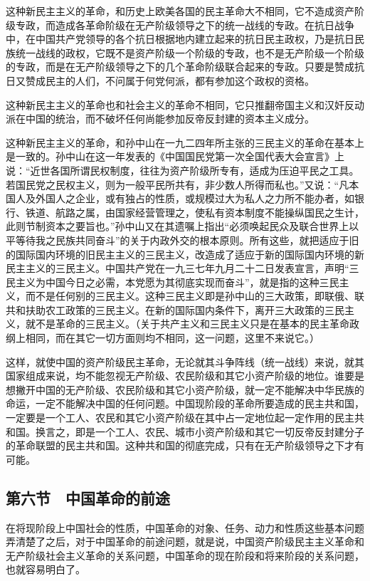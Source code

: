 这种新民主主义的革命，和历史上欧美各国的民主革命大不相同，它不造成资产阶级专政，而造成各革命阶级在无产阶级领导之下的统一战线的专政。在抗日战争中，在中国共产党领导的各个抗日根据地内建立起来的抗日民主政权，乃是抗日民族统一战线的政权，它既不是资产阶级一个阶级的专政，也不是无产阶级一个阶级的专政，而是在无产阶级领导之下的几个革命阶级联合起来的专政。只要是赞成抗日又赞成民主的人们，不问属于何党何派，都有参加这个政权的资格。

这种新民主主义的革命也和社会主义的革命不相同，它只推翻帝国主义和汉奸反动派在中国的统治，而不破坏任何尚能参加反帝反封建的资本主义成分。

这种新民主主义的革命，和孙中山在一九二四年所主张的三民主义的革命在基本上是一致的。孙中山在这一年发表的《中国国民党第一次全国代表大会宣言》上说：“近世各国所谓民权制度，往往为资产阶级所专有，适成为压迫平民之工具。若国民党之民权主义，则为一般平民所共有，非少数人所得而私也。”又说：“凡本国人及外国人之企业，或有独占的性质，或规模过大为私人之力所不能办者，如银行、铁道、航路之属，由国家经营管理之，使私有资本制度不能操纵国民之生计，此则节制资本之要旨也。”孙中山又在其遗嘱上指出“必须唤起民众及联合世界上以平等待我之民族共同奋斗”的关于内政外交的根本原则。所有这些，就把适应于旧的国际国内环境的旧民主主义的三民主义，改造成了适应于新的国际国内环境的新民主主义的三民主义。中国共产党在一九三七年九月二十二日发表宣言，声明“三民主义为中国今日之必需，本党愿为其彻底实现而奋斗”，就是指的这种三民主义，而不是任何别的三民主义。这种三民主义即是孙中山的三大政策，即联俄、联共和扶助农工政策的三民主义。在新的国际国内条件下，离开三大政策的三民主义，就不是革命的三民主义。（关于共产主义和三民主义只是在基本的民主革命政纲上相同，而在其它一切方面则均不相同，这一问题，这里不来说它。）

这样，就使中国的资产阶级民主革命，无论就其斗争阵线（统一战线）来说，就其国家组成来说，均不能忽视无产阶级、农民阶级和其它小资产阶级的地位。谁要是想撇开中国的无产阶级、农民阶级和其它小资产阶级，就一定不能解决中华民族的命运，一定不能解决中国的任何问题。中国现阶段的革命所要造成的民主共和国，一定要是一个工人、农民和其它小资产阶级在其中占一定地位起一定作用的民主共和国。换言之，即是一个工人、农民、城市小资产阶级和其它一切反帝反封建分子的革命联盟的民主共和国。这种共和国的彻底完成，只有在无产阶级领导之下才有可能。

\subsection{第六节　中国革命的前途}

在将现阶段上中国社会的性质，中国革命的对象、任务、动力和性质这些基本问题弄清楚了之后，对于中国革命的前途问题，就是说，中国资产阶级民主主义革命和无产阶级社会主义革命的关系问题，中国革命的现在阶段和将来阶段的关系问题，也就容易明白了。

